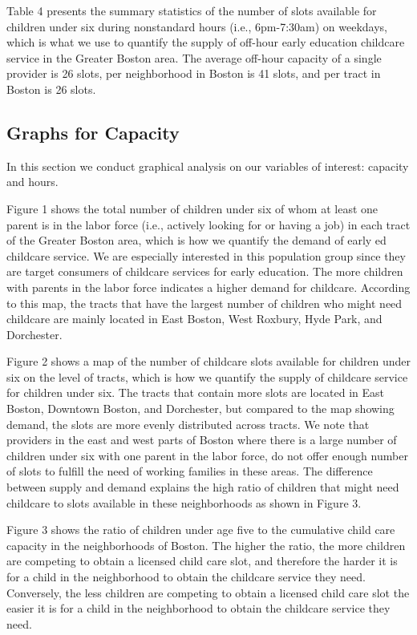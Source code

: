 \documentclass[10pt,letterpaper]{article}
\begin{document}
Table 4 presents the summary statistics of the number of slots available
for children under six during nonstandard hours (i.e., 6pm-7:30am) on
weekdays, which is what we use to quantify the supply of off-hour early
education childcare service in the Greater Boston area. The average
off-hour capacity of a single provider is 26 slots, per neighborhood in
Boston is 41 slots, and per tract in Boston is 26 slots.

\subsection{Graphs for Capacity}\label{graphs-for-capacity}

In this section we conduct graphical analysis on our variables of
interest: capacity and hours.

Figure 1 shows the total number of children under six of whom at least
one parent is in the labor force (i.e., actively looking for or having a
job) in each tract of the Greater Boston area, which is how we quantify
the demand of early ed childcare service. We are especially interested
in this population group since they are target consumers of childcare
services for early education. The more children with parents in the
labor force indicates a higher demand for childcare. According to this
map, the tracts that have the largest number of children who might need
childcare are mainly located in East Boston, West Roxbury, Hyde Park,
and Dorchester.

Figure 2 shows a map of the number of childcare slots available for
children under six on the level of tracts, which is how we quantify the
supply of childcare service for children under six. The tracts that
contain more slots are located in East Boston, Downtown Boston, and
Dorchester, but compared to the map showing demand, the slots are more
evenly distributed across tracts. We note that providers in the east and
west parts of Boston where there is a large number of children under six
with one parent in the labor force, do not offer enough number of slots
to fulfill the need of working families in these areas. The difference
between supply and demand explains the high ratio of children that might
need childcare to slots available in these neighborhoods as shown in
Figure 3.

Figure 3 shows the ratio of children under age five to the cumulative
child care capacity in the neighborhoods of Boston. The higher the
ratio, the more children are competing to obtain a licensed child care
slot, and therefore the harder it is for a child in the neighborhood to
obtain the childcare service they need. Conversely, the less children
are competing to obtain a licensed child care slot the easier it is for
a child in the neighborhood to obtain the childcare service they need.
\end{document}
